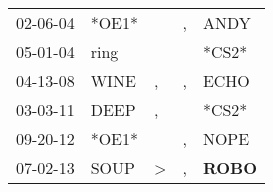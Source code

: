 \begin{supertabular}{p{0.07\textwidth}p{0.06\textwidth}p{0.02\textwidth}p{0.02\textwidth}p{0.06\textwidth}}
 02-06-04\textsuperscript{} &                   *OE1* &               &  , &           ANDY\textsuperscript{} \\
 05-01-04\textsuperscript{} &  ring\textsuperscript{} &               &    &                            *CS2* \\
 04-13-08\textsuperscript{} &  WINE\textsuperscript{} &             , &  , &           ECHO\textsuperscript{} \\
 03-03-11\textsuperscript{} &  DEEP\textsuperscript{} &             , &    &                            *CS2* \\
 09-20-12\textsuperscript{} &                   *OE1* &               &  , &           NOPE\textsuperscript{} \\
 07-02-13\textsuperscript{} &  SOUP\textsuperscript{} &  \textgreater &  , &  \textbf{ROBO\textsuperscript{}} \\
\end{supertabular}
